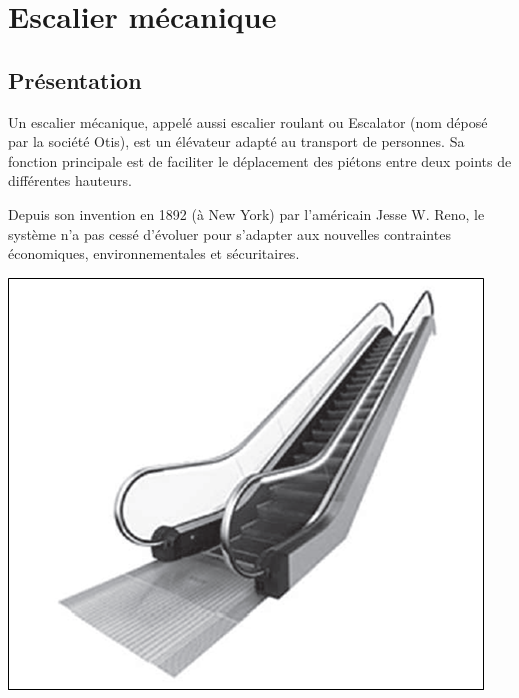 \documentclass[10pt,fleqn]{article} %
\begin{document}

\vspace{4cm}
\pagestyle{fancy}
\thispagestyle{plain}
\def\pathfig{images2}
\def\columnseprulecolor{\color{ocre}}
\setlength{\columnseprule}{0.4pt} 


\section{Escalier mécanique}
\subsection{Présentation}
\noindent\begin{minipage}[c]{.6\linewidth}
Un escalier mécanique, appelé aussi escalier roulant ou Escalator (nom déposé par la société Otis), est un élévateur adapté au transport de personnes. Sa fonction principale est de faciliter le déplacement des piétons entre deux points de différentes hauteurs. 

Depuis son invention en 1892 (à New York) par l’américain Jesse W. Reno, le système n’a pas cessé d’évoluer pour s’adapter aux nouvelles contraintes économiques, environnementales et sécuritaires.

\end{minipage}\hfill
\begin{minipage}[c]{.36\linewidth}
\begin{center}
\includegraphics[width=.95\linewidth]{images/fig_00}
\end{center}
\end{minipage}
\end{document}
